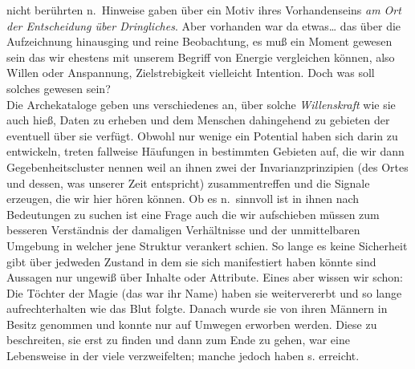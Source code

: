 \documentclass[
]{article}
\begin{document}
\begin{enumerate}
  nicht berührten n.~Hinweise gaben über ein Motiv ihres Vorhandenseins
  \emph{am Ort der Entscheidung über Dringliches}. Aber vorhanden war da
  etwas\ldots{} das über die Aufzeichnung hinausging und reine
  Beobachtung, es muß ein Moment gewesen sein das wir ehestens mit
  unserem Begriff von Energie vergleichen können, also Willen oder
  Anspannung, Zielstrebigkeit vielleicht Intention. Doch was soll
  solches gewesen sein?\\
  Die Archekataloge geben uns verschiedenes an, über solche
  \emph{Willenskraft} wie sie auch hieß, Daten zu erheben und dem
  Menschen dahingehend zu gebieten der eventuell über sie verfügt.
  Obwohl nur wenige ein Potential haben sich darin zu entwickeln, treten
  fallweise Häufungen in bestimmten Gebieten auf, die wir dann
  Gegebenheitscluster nennen weil an ihnen zwei der Invarianzprinzipien
  (des Ortes und dessen, was unserer Zeit entspricht) zusammentreffen
  und die Signale erzeugen, die wir hier hören können. Ob es n.~sinnvoll
  ist in ihnen nach Bedeutungen zu suchen ist eine Frage auch die wir
  aufschieben müssen zum besseren Verständnis der damaligen Verhältnisse
  und der unmittelbaren Umgebung in welcher jene Struktur verankert
  schien. So lange es keine Sicherheit gibt über jedweden Zustand in dem
  sie sich manifestiert haben könnte sind Aussagen nur ungewiß über
  Inhalte oder Attribute. Eines aber wissen wir schon:\\
  Die Töchter der Magie (das war ihr Name) haben sie weitervererbt und
  so lange aufrechterhalten wie das Blut folgte. Danach wurde sie von
  ihren Männern in Besitz genommen und konnte nur auf Umwegen erworben
  werden. Diese zu beschreiten, sie erst zu finden und dann zum Ende zu
  gehen, war eine Lebensweise in der viele verzweifelten; manche jedoch
  haben s. erreicht.
\end{enumerate}
\end{document}

